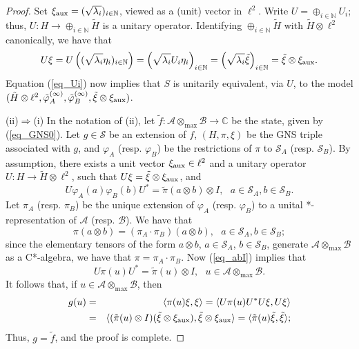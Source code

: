 \documentclass[11pt]{amsart}
\theoremstyle{definition}
\newcommand\nph{\varphi}
\newcommand{\cl}[1]{\mathcal{#1}}
\newcommand{\bb}[1]{\mathbb{#1}}
\begin{document}
\begin{proof}
Set $\xi_{\rm aux} = (\sqrt{\lambda_i})_{i\in \bb{N}}$, viewed as a (unit) vector 
in $\ell^2$. 
Write $U = \oplus_{i\in \bb{N}} U_i$; thus, $U : H\to \oplus_{i\in \bb{N}}\tilde{H}$
is a unitary operator. Identifying $\oplus_{i\in \bb{N}}\tilde{H}$ with 
$\tilde{H}\otimes\ell^2$ canonically, 
we have that 
$$U\xi = U\left((\sqrt{\lambda_i}\eta_i)_{i\in \bb{N}}\right) = \left(\sqrt{\lambda_i}U_i\eta_i\right)_{i\in \bb{N}}
= \left(\sqrt{\lambda_i}\tilde{\xi}\right)_{i\in \bb{N}} = \tilde{\xi}\otimes\xi_{\rm aux}.$$
Equation (\ref{eq_Ui}) now implies that 
$S$ is unitarily equivalent, via $U$, to the model
$(\tilde{H}\otimes\ell^2,\tilde{\nph}_A^{(\infty)}, \tilde{\nph}_B^{(\infty)},
\tilde{\xi}\otimes \xi_{\rm aux})$.

(ii)$\Rightarrow$(i) 
In the notation of (ii), let 
$\tilde{f} : \cl A\otimes_{\max}\cl B\to \bb{C}$ be the state, 
given by (\ref{eq_GNS0}). 
Let $g \in \cl S$ be an extension of $f$, 
$(H,\pi,\xi)$ be the GNS triple associated with $g$, 
and $\nph_A$ (resp. $\nph_B$) be the restrictions of $\pi$ to 
$\cl S_A$ (resp. $\cl S_B$). 
By assumption, there exists a unit vector $\xi_{\rm aux}\in \ell^2$
and a unitary operator $U : H\to \tilde{H}\otimes\ell^2$, such that 
$U\xi = \tilde{\xi}\otimes\xi_{\rm aux}$, and 
\begin{equation}\label{eq_abI}
U\nph_A(a)\nph_B(b)U^* = \tilde{\pi}(a\otimes b)\otimes I, \ \ \ 
a\in \cl S_A, b\in \cl S_B.
\end{equation}
Let $\pi_A$ (resp. $\pi_B$) be the unique extension of $\nph_A$ (resp. $\nph_B$)
to a unital *-representation of $\cl A$ (resp. $\cl B$). 
We have that 
$$\pi(a\otimes b) = (\pi_A\cdot \pi_B)(a\otimes b), \ \ \ a\in \cl S_A, b\in \cl S_B;$$
since the elementary tensors of the form $a\otimes b$, $a\in \cl S_A$, $b\in \cl S_B$, 
generate $\cl A\otimes_{\max}\cl B$ as a C*-algebra, we have that 
$\pi = \pi_A\cdot \pi_B$. 
Now (\ref{eq_abI}) implies that 
$$U\pi(u)U^* = \tilde{\pi}(u)\otimes I, \ \ \ u\in \cl A\otimes_{\max}\cl B.$$
It follows that, if $u\in \cl A\otimes_{\max}\cl B$, then 
\begin{eqnarray*}
g(u) 
& = & 
\langle \pi(u)\xi,\xi\rangle 
= \langle U\pi(u)U^*U\xi,U\xi\rangle\\
& = & \langle (\tilde{\pi}(u)\otimes I)(\tilde{\xi}\otimes\xi_{\rm aux}),
\tilde{\xi}\otimes\xi_{\rm aux}\rangle
=
\langle \tilde{\pi}(u)\tilde{\xi},\tilde{\xi}\rangle;
\end{eqnarray*}
Thus, $g = \tilde{f}$, and the proof is complete. 
\end{proof}
\end{document}
